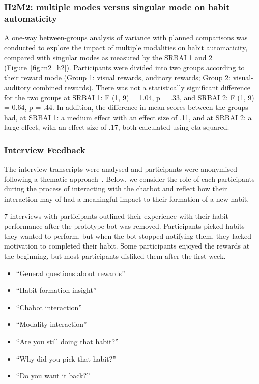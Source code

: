 \subsubsection*{H2M2: multiple modes versus singular mode on habit automaticity}
A one-way between-groups analysis of variance with planned comparisons was conducted to explore the
impact of multiple modalities on habit automaticity, compared with singular modes as measured by the SRBAI 1 and 2 (Figure~\ref{fig:m2_h2}). Participants were divided into two groups according to their reward mode (Group 1: visual rewards, auditory rewards; Group 2: visual-auditory combined rewards). There was not a
statistically significant difference for the two groups at SRBAI 1: F (1, 9) = 1.04, p = .33, and SRBAI 2: F (1, 9) = 0.64, p = .44. In addition, the difference in mean scores between the groups had, at SRBAI 1: a medium effect with an effect size of .11, and at SRBAI 2: a large effect, with an effect size of .17, both calculated using eta squared.



\subsubsection{Interview Feedback}
The interview transcripts were analysed and participants were anonymised following a thematic approach~\cite{thematic_analysis_qualatitive_data}. Below, we consider the role of each participants during the process of interacting with the chatbot and reflect how their interaction may of had a meaningful impact to their formation of a new habit.

7 interviews with participants outlined their experience with their habit performance after the prototype bot was removed. Participants picked habits they wanted to perform, but when the bot stopped notifying them, they lacked motivation to completed their habit. Some participants enjoyed the rewards at the beginning, but most participants disliked them after the first week.

\begin{itemize}
  \item ``General questions about rewards''
  \item ``Habit formation insight''
  \item ``Chabot interaction''
  \item ``Modality interaction''
  \item ``Are you still doing that habit?''
  \item ``Why did you pick that habit?''
  \item ``Do you want it back?''
\end{itemize}


